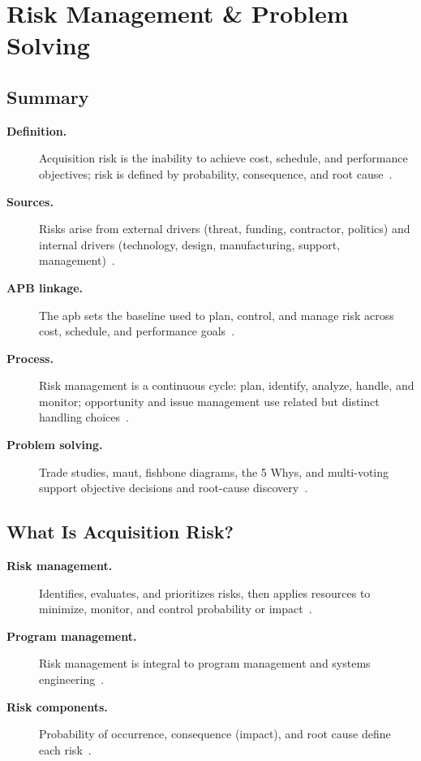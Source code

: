 \documentclass[../main.tex]{subfiles}
\begin{document}
\section{Risk Management \& Problem Solving}

\subsection{Summary}
\begin{description}
  \item[\textbf{Definition.}] Acquisition risk is the inability to achieve cost, schedule, and performance objectives; risk is defined by probability, consequence, and root cause~\autocite{edo-3-3-6-risk-management-problem-solving-2025,DoD-RIO-Guide-2017}.
  \item[\textbf{Sources.}] Risks arise from external drivers (threat, funding, contractor, politics) and internal drivers (technology, design, manufacturing, support, management)~\autocite{edo-3-3-6-risk-management-problem-solving-2025}.
  \item[\textbf{APB linkage.}] The \ac{apb} sets the baseline used to plan, control, and manage risk across cost, schedule, and performance goals~\autocite{edo-3-3-6-risk-management-problem-solving-2025}.
  \item[\textbf{Process.}] Risk management is a continuous cycle: plan, identify, analyze, handle, and monitor; opportunity and issue management use related but distinct handling choices~\autocite{edo-3-3-6-risk-management-problem-solving-2025,DoD-RIO-Guide-2017}.
  \item[\textbf{Problem solving.}] Trade studies, \ac{maut}, fishbone diagrams, the 5 Whys, and multi-voting support objective decisions and root-cause discovery~\autocite{edo-3-3-6-risk-management-problem-solving-2025}.
\end{description}

\subsection{What Is Acquisition Risk?}
\begin{description}
  \item[\textbf{Risk management.}] Identifies, evaluates, and prioritizes risks, then applies resources to minimize, monitor, and control probability or impact~\autocite{edo-3-3-6-risk-management-problem-solving-2025}.
  \item[\textbf{Program management.}] Risk management is integral to program management and systems engineering~\autocite{edo-3-3-6-risk-management-problem-solving-2025}.
  \item[\textbf{Risk components.}] Probability of occurrence, consequence (impact), and root cause define each risk~\autocite{edo-3-3-6-risk-management-problem-solving-2025,DoD-RIO-Guide-2017}.
\end{description}
\end{document}
